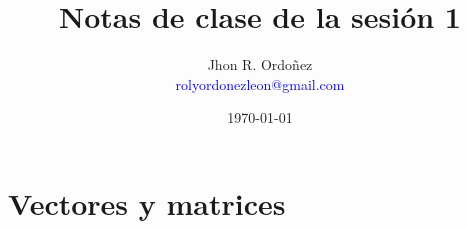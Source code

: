\documentclass{article}
\title{Notas de clase de la sesión 1}
\author{
        Jhon R. Ordoñez \\
        \textcolor{blue}{rolyordonezleon@gmail.com}
    }
\date{\today}
\begin{document}
        \maketitle
        \thispagestyle{fancy}
    \section{Vectores y matrices}
        
		
\end{document}
